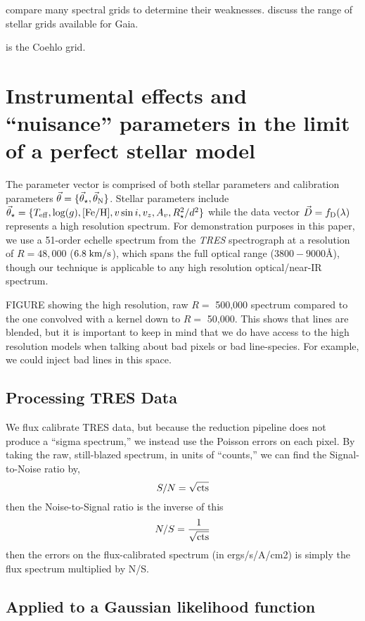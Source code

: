 \documentclass[preprint]{aastex} %
\newcommand{\vt}{\vec{\theta}}
\newcommand{\vstar}{\vt_{\star}}
\newcommand{\vN}{\vt_{\rm N}}
\newcommand{\fD}{f_{\rm D}}
\newcommand{\vD}{\vec{D}}
\begin{document}
\citet{mc07} compare many spectral grids to determine their weaknesses. \citep{svt+11} discuss the range of stellar grids available for Gaia.

\citep{cbm+05} is the Coehlo grid.


\section{Instrumental effects and ``nuisance'' parameters in the limit of a perfect stellar model}

The parameter vector is comprised of both stellar parameters and calibration parameters $\vt = \{\vstar, \vN \}$. Stellar parameters include $\vstar = \{T_{\rm eff}, \log(g), [{\rm Fe}/{\rm H}], v \sin i, v_z, A_v, R_\star^2/d^2 \}$ while the data vector $\vD = \fD(\lambda)$ represents a high resolution spectrum. For demonstration purposes in this paper, we use a 51-order echelle spectrum from the \emph{TRES} spectrograph at a resolution of $R=48,000$ ($6.8\;{\rm km/s}$), which spans the full optical range ($3800-9000$\AA), though our technique is applicable to any high resolution optical/near-IR spectrum.


FIGURE showing the high resolution, raw $R =$ 500,000 spectrum compared to the one convolved with a kernel down to $R =$ 50,000. This shows that lines are blended, but it is important to keep in mind that we do have access to the high resolution models when talking about bad pixels or bad line-species. For example, we could inject bad lines in this space.

\subsection{Processing TRES Data}
We flux calibrate TRES data, but because the reduction pipeline does not produce a ``sigma spectrum,'' we instead use the Poisson errors on each pixel. By taking the raw, still-blazed spectrum, in units of ``counts,'' we can find the Signal-to-Noise ratio by,
\begin{equation}
  S/N = \sqrt{ {\rm cts}}
\end{equation}
then the Noise-to-Signal ratio is the inverse of this
\begin{equation}
  N/S = \frac{1}{\sqrt{ {\rm cts}}}
\end{equation}
then the errors on the flux-calibrated spectrum (in ergs/s/A/cm2) is simply the flux spectrum multiplied by N/S. 

\subsection{Applied to a Gaussian likelihood function}
\end{document}
